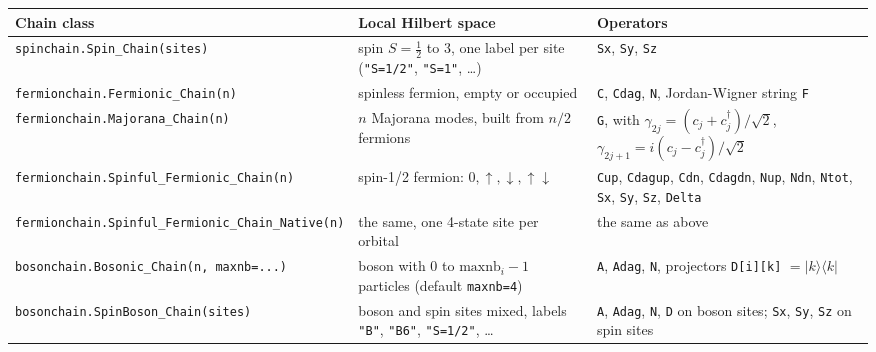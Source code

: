 \documentclass[11pt]{article}
\begin{document}
{\footnotesize
\begin{longtable}[]{@{}
  >{\raggedright\arraybackslash}p{}
  >{\raggedright\arraybackslash}p{}
  >{\raggedright\arraybackslash}p{}@{}}
\toprule\noalign{}
\begin{minipage}[b]{\linewidth}\raggedright
Chain class
\end{minipage} & \begin{minipage}[b]{\linewidth}\raggedright
Local Hilbert space
\end{minipage} & \begin{minipage}[b]{\linewidth}\raggedright
Operators
\end{minipage} \\
\midrule\noalign{}
\endhead
\bottomrule\noalign{}
\endlastfoot
\texttt{spinchain.\allowbreak{}Spin\_\allowbreak{}Chain(sites)} & spin \(S=\tfrac12\) to \(3\), one label per site (\texttt{"S=1/2"}, \texttt{"S=1"}, \ldots) & \texttt{Sx}, \texttt{Sy}, \texttt{Sz} \\
\texttt{fermionchain.\allowbreak{}Fermionic\_\allowbreak{}Chain(n)} & spinless fermion, empty or occupied & \texttt{C}, \texttt{Cdag}, \texttt{N}, Jordan-Wigner string \texttt{F} \\
\texttt{fermionchain.\allowbreak{}Majorana\_\allowbreak{}Chain(n)} & \(n\) Majorana modes, built from \(n/2\) fermions & \texttt{G}, with \(\gamma_{2j}=(c_j+c_j^\dagger)/\sqrt2\), \(\gamma_{2j+1}=i(c_j-c_j^\dagger)/\sqrt2\) \\
\texttt{fermionchain.\allowbreak{}Spinful\_\allowbreak{}Fermionic\_\allowbreak{}Chain(n)} & spin-1/2 fermion: \(0,\uparrow,\downarrow,\uparrow\downarrow\) & \texttt{Cup}, \texttt{Cdagup}, \texttt{Cdn}, \texttt{Cdagdn}, \texttt{Nup}, \texttt{Ndn}, \texttt{Ntot}, \texttt{Sx}, \texttt{Sy}, \texttt{Sz}, \texttt{Delta} \\
\texttt{fermionchain.\allowbreak{}Spinful\_\allowbreak{}Fermionic\_\allowbreak{}Chain\_\allowbreak{}Native(n)} & the same, one 4-state site per orbital & the same as above \\
\texttt{bosonchain.\allowbreak{}Bosonic\_\allowbreak{}Chain(n,\ maxnb=.\allowbreak{}.\allowbreak{}.\allowbreak{})} & boson with \(0\) to \(\text{maxnb}_i-1\) particles (default \texttt{maxnb=4}) & \texttt{A}, \texttt{Adag}, \texttt{N}, projectors \texttt{D{[}i{]}{[}k{]}} \(=|k\rangle\langle k|\) \\
\texttt{bosonchain.\allowbreak{}SpinBoson\_\allowbreak{}Chain(sites)} & boson and spin sites mixed, labels \texttt{"B"}, \texttt{"B6"}, \texttt{"S=1/2"}, \ldots{} & \texttt{A}, \texttt{Adag}, \texttt{N}, \texttt{D} on boson sites; \texttt{Sx}, \texttt{Sy}, \texttt{Sz} on spin sites \\

\end{longtable}}
\end{document}
